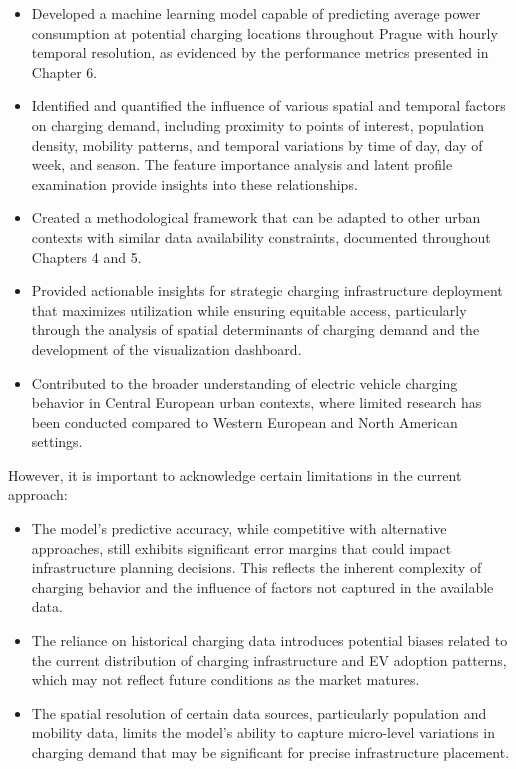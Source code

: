 \begin{itemize}
    \item Developed a machine learning model capable of predicting average power consumption at potential charging locations throughout Prague with hourly temporal resolution, as evidenced by the performance metrics presented in Chapter 6.

    \item Identified and quantified the influence of various spatial and temporal factors on charging demand, including proximity to points of interest, population density, mobility patterns, and temporal variations by time of day, day of week, and season. The feature importance analysis and latent profile examination provide insights into these relationships.

    \item Created a methodological framework that can be adapted to other urban contexts with similar data availability constraints, documented throughout Chapters 4 and 5.

    \item Provided actionable insights for strategic charging infrastructure deployment that maximizes utilization while ensuring equitable access, particularly through the analysis of spatial determinants of charging demand and the development of the visualization dashboard.

    \item Contributed to the broader understanding of electric vehicle charging behavior in Central European urban contexts, where limited research has been conducted compared to Western European and North American settings.
\end{itemize}

However, it is important to acknowledge certain limitations in the current approach:

\begin{itemize}
    \item The model's predictive accuracy, while competitive with alternative approaches, still exhibits significant error margins that could impact infrastructure planning decisions. This reflects the inherent complexity of charging behavior and the influence of factors not captured in the available data.

    \item The reliance on historical charging data introduces potential biases related to the current distribution of charging infrastructure and EV adoption patterns, which may not reflect future conditions as the market matures.

    \item The spatial resolution of certain data sources, particularly population and mobility data, limits the model's ability to capture micro-level variations in charging demand that may be significant for precise infrastructure placement.
\end{itemize}

